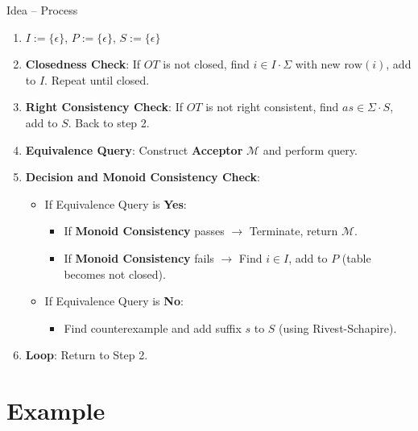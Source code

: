 \documentclass{beamer}
\begin{document}
\begin{frame}{Idea -- Process}
\begin{enumerate}
    \item $I := \{\epsilon\}$, $P:=\{\epsilon\}$, $S:= \{\epsilon\}$
    \item \textbf{Closedness Check}: If $OT$ is not closed, find $i \in I\cdot\Sigma $ with new $\text{row}(i)$, add to $I$. Repeat until closed.
    \item \textbf{Right Consistency Check}: If $OT$ is not right consistent, find $as \in \Sigma\cdot S$, add to $S$. Back to step 2.
    \item \textbf{Equivalence Query}: Construct \textbf{Acceptor} $\mathcal{M}$ and perform query.
    \item \textbf{Decision and Monoid Consistency Check}:
    \begin{itemize}
        \item If Equivalence Query is \textbf{Yes}:
        \begin{itemize}
            \item If \textbf{Monoid Consistency} passes $\rightarrow$ Terminate, return $\mathcal{M}$.
            \item If \textbf{Monoid Consistency} fails $\rightarrow$ Find $i \in I$, add to $P$ (table becomes not closed).
        \end{itemize}
        \item If Equivalence Query is \textbf{No}:
        \begin{itemize}
            \item Find counterexample and add suffix $s$ to $S$ (using Rivest-Schapire).
        \end{itemize}
    \end{itemize}
    \item \textbf{Loop}: Return to Step 2.
\end{enumerate}
\end{frame}

\section{Example}
\end{document}
